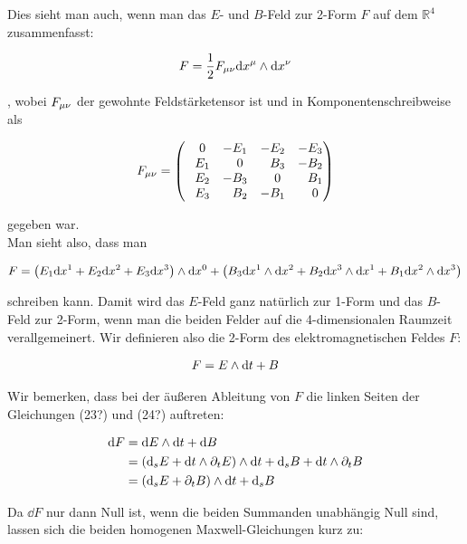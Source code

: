 Dies sieht man auch, wenn man das $E$- und $B$-Feld zur 2-Form $F$ auf dem $\mathbb{R}^4$ zusammenfasst:

\begin{align}
F = \frac{1}{2} F_{\mu \nu} \dd x^{\mu} \wedge \dd x^{\nu}
\end{align}

, wobei $F_{\mu \nu}$ der gewohnte Feldstärketensor ist und in Komponentenschreibweise als 

\begin{align}
F_{\mu \nu} =
\begin{pmatrix}
\phantom{-}0 & -E_1 & -E_2 & -E_3 \\
\phantom{-}E_1 & \phantom{-}0 & \phantom{-}B_3 & -B_2 \\
\phantom{-}E_2 & -B_3 & \phantom{-}0 & \phantom{-}B_1 \\
\phantom{-}E_3 & \phantom{-}B_2 & -B_1 & \phantom{-}0
\end{pmatrix}
\end{align}

gegeben war. \\

Man sieht also, dass man

\begin{align}
F = \left( E_1 \dd x^1 +E_2 \dd x^2+ E_3 \dd x^3 \right) \wedge \dd x^0 + \left( B_3 \dd x^1 \wedge \dd x^2 + B_2 \dd x^3 \wedge \dd x^1 + B_1 \dd x^2 \wedge \dd x^3 \right)
\end{align}

schreiben kann. Damit wird das $E$-Feld ganz natürlich zur 1-Form und das $B$-Feld zur 2-Form, wenn man die beiden Felder auf die 4-dimensionalen Raumzeit verallgemeinert. Wir definieren also die 2-Form des elektromagnetischen Feldes $F$:

\begin{align}  
F= E \wedge \dd t + B 
\end{align} 

Wir bemerken, dass bei der äußeren Ableitung von $F$ die linken Seiten der Gleichungen (23?) und (24?) auftreten:

\begin{align}
\dd F &= \dd E \wedge \dd t + \dd B \notag \\
		&= (\dd_s E + \dd t \wedge \partial_t E ) \wedge \dd t + \dd_s B + \dd t \wedge \partial_t B \notag \\
		&= (\dd_s E + \partial_t B) \wedge \dd t + \dd_s B
\end{align}

Da $\dd F$ nur dann Null ist, wenn die beiden Summanden unabhängig Null sind, lassen sich die beiden homogenen Maxwell-Gleichungen kurz zu: 

